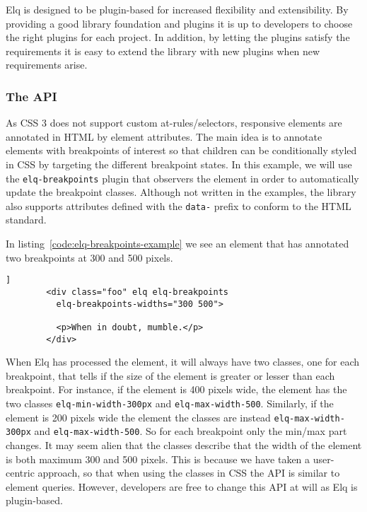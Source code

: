 \documentclass{acm_proc_article-sp}
\newcommand{\code}[1]{\texttt{#1}}
\begin{document}
    Elq is designed to be plugin-based for increased flexibility and extensibility.
    By providing a good library foundation and plugins it is up to developers to choose the right plugins for each project.
    In addition, by letting the plugins satisfy the requirements it is easy to extend the library with new plugins when new requirements arise.

    \subsubsection{The API}
      As CSS 3 does not support custom at-rules/selectors, responsive elements are annotated in HTML by element attributes.
      The main idea is to annotate elements with breakpoints of interest so that children can be conditionally styled in CSS by targeting the different breakpoint states.
      In this example, we will use the \code{elq-breakpoints} plugin that observers the element in order to automatically update the breakpoint classes.
      Although not written in the examples, the library also supports attributes defined with the \code{data-} prefix to conform to the HTML standard.

      In listing~\ref{code:elq-breakpoints-example} we see an element that has annotated two breakpoints at 300 and 500 pixels.

      \begin{lstlisting}[gobble=8,caption={},captionpos=b,label={code:elq-breakpoints-example}]]
        <div class="foo" elq elq-breakpoints
          elq-breakpoints-widths="300 500">
          
          <p>When in doubt, mumble.</p>
        </div>
      \end{lstlisting}

      When Elq has processed the element, it will always have two classes, one for each breakpoint, that tells if the size of the element is greater or lesser than each breakpoint.
      For instance, if the element is 400 pixels wide, the element has the two classes \code{elq-min-width-300px} and \code{elq-max-width-500}.
      Similarly, if the element is 200 pixels wide the element the classes are instead \code{elq-max-width-300px} and \code{elq-max-width-500}.
      So for each breakpoint only the min/max part changes.
      It may seem alien that the classes describe that the width of the element is both maximum 300 and 500 pixels.
      This is because we have taken a user-centric approach, so that when using the classes in CSS the API is similar to element queries.
      However, developers are free to change this API at will as Elq is plugin-based.
\end{document}
